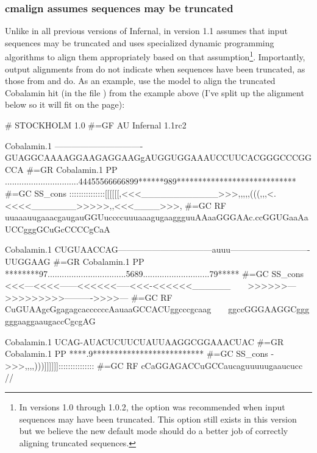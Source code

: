 \subsubsection{cmalign assumes sequences may be truncated}
Unlike in all previous versions of Infernal,  in version
1.1 assumes that input sequences may be truncated and uses specialized
dynamic programming algorithms to align them appropriately based on
that assumption\footnote{In versions 1.0 through 1.0.2, the
    option was recommended when input
  sequences may have been truncated. This option still exists in this
  version but we believe the new default mode should do a better job
  of correctly aligning truncated sequences.}. Importantly, output
alignments from  do not indicate when sequences have
been truncated, as those from  and  do. As
an example, use the  model to align the
truncated Cobalamin hit (in the file )
from the  example above (I've split up the alignment
below so it will fit on the page):


\label{cmalign-cobalamin}
\begin{sreoutput}
# STOCKHOLM 1.0
#=GF AU Infernal 1.1rc2

Cobalamin.1         -------------------------------GUAGGCAAAAGGAAGAGGAAGgAUGGUGGAAAUCCUUCACGGGCCCGGCCA
#=GR Cobalamin.1 PP ...............................44455566666899******989****************************
#=GC SS_cons        :::::::::::::::[[[[[[,<<<____________>>>,,,,,(((,,,<.<<<<_______>>>>>,,<<<____>>>,
#=GC RF             uuaaauugaaacgaugauGGUuccccuuuaaagugaaggguuAAaaGGGAAc.ccGGUGaaAaUCCgggGCuGcCCCCgCaA

Cobalamin.1         CUGUAACCAG---------------------------------auuu----------------------------UUGGAAG
#=GR Cobalamin.1 PP ********97.................................5689............................79*****
#=GC SS_cons        <<<---<<<<------<<<<<<-----<<<-<<<<<<______~~~~>>>>>>--->>>>>>>>>---------->>>>---
#=GC RF             CuGUAAgcGgagagcaccccccAauaaGCCACUggcccgcaag~~~~ggccGGGAAGGCggggggaaggaaugaccCgcgAG

Cobalamin.1         UCAG-AUACUCUUCUAUUAAGGCGGAAACUAC
#=GR Cobalamin.1 PP ****.9**************************
#=GC SS_cons        ->>>,,,,)))]]]]]]:::::::::::::::
#=GC RF             cCaGGAGACCuGCCaucaguuuuugaaucucc
//
\end{sreoutput}

